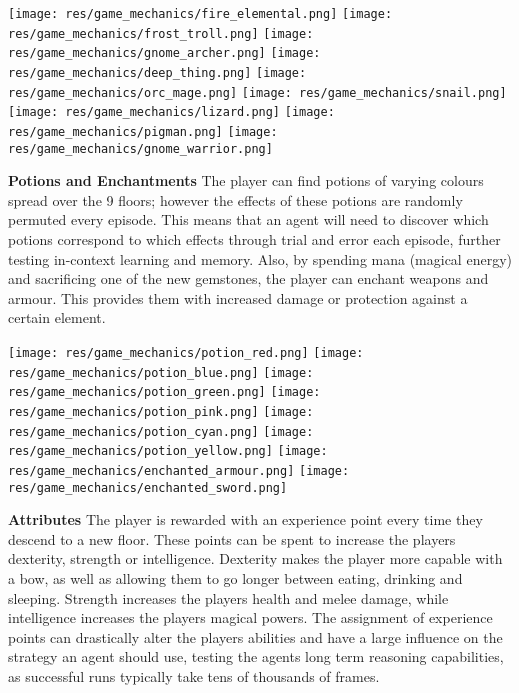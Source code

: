 \documentclass{article}
\theoremstyle{plain}
\theoremstyle{definition}
\theoremstyle{remark}
\begin{document}
\texttt{[image: res/game\_mechanics/fire\_elemental.png]}
\texttt{[image: res/game\_mechanics/frost\_troll.png]}
\texttt{[image: res/game\_mechanics/gnome\_archer.png]}
\texttt{[image: res/game\_mechanics/deep\_thing.png]}
\texttt{[image: res/game\_mechanics/orc\_mage.png]}
\texttt{[image: res/game\_mechanics/snail.png]}
\texttt{[image: res/game\_mechanics/lizard.png]}
\texttt{[image: res/game\_mechanics/pigman.png]}
\texttt{[image: res/game\_mechanics/gnome\_warrior.png]}

\textbf{Potions and Enchantments} The player can find potions of varying colours spread over the 9 floors; however the effects of these potions are randomly permuted every episode. This means that an agent will need to discover which potions correspond to which effects through trial and error each episode, further testing in-context learning and memory. Also, by spending mana (magical energy) and sacrificing one of the new gemstones, the player can enchant weapons and armour. This provides them with increased damage or protection against a certain element.

{\centering
\texttt{[image: res/game\_mechanics/potion\_red.png]}
\texttt{[image: res/game\_mechanics/potion\_blue.png]}
\texttt{[image: res/game\_mechanics/potion\_green.png]}
\texttt{[image: res/game\_mechanics/potion\_pink.png]}
\texttt{[image: res/game\_mechanics/potion\_cyan.png]}
\texttt{[image: res/game\_mechanics/potion\_yellow.png]}
\texttt{[image: res/game\_mechanics/enchanted\_armour.png]}
\texttt{[image: res/game\_mechanics/enchanted\_sword.png]}
\par}


\textbf{Attributes} The player is rewarded with an experience point every time they descend to a new floor.  These points can be spent to increase the players dexterity, strength or intelligence.  Dexterity makes the player more capable with a bow, as well as allowing them to go longer between eating, drinking and sleeping.  Strength increases the players health and melee damage, while intelligence increases the players magical powers.  The assignment of experience points can drastically alter the players abilities and have a large influence on the strategy an agent should use, testing the agents long term reasoning capabilities, as successful runs typically take tens of thousands of frames.
\end{document}
